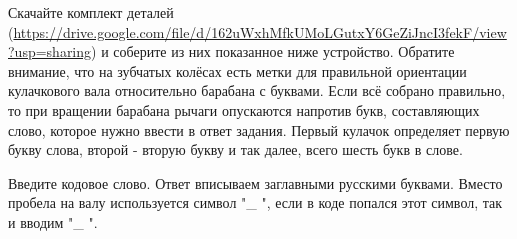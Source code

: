
Скачайте комплект деталей \\(\url{https://drive.google.com/file/d/162uWxhMfkUMoLGutxY6GeZiJncI3fekF/view?usp=sharing}) и соберите из них показанное ниже устройство. Обратите внимание, что на зубчатых колёсах есть метки для правильной ориентации кулачкового вала относительно барабана с буквами. Если всё собрано правильно, то при вращении барабана рычаги опускаются напротив букв, составляющих слово, которое нужно ввести в ответ задания. Первый кулачок определяет первую букву слова, второй - вторую букву и так далее, всего шесть букв в слове.


Введите кодовое слово.  Ответ вписываем заглавными русскими буквами. 
Вместо пробела на валу используется символ  "\_ ", если в коде попался этот символ, так и вводим "\_ ".


